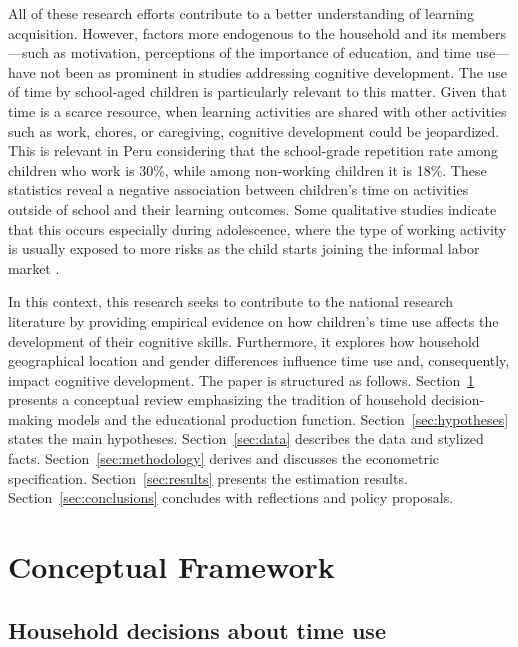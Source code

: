 \documentclass[12pt]{article}
\begin{document}
All of these research efforts contribute to a better understanding of learning
acquisition. However, factors more endogenous to the household and its
members—such as motivation, perceptions of the importance of education, and
time use—have not been as prominent in studies addressing cognitive
development. The use of time by school-aged children is particularly relevant
to this matter. Given that time is a scarce resource, when learning activities
are shared with other activities such as work, chores, or caregiving, cognitive
development could be jeopardized. This is relevant in Peru considering that
the school-grade repetition rate among children who work is 30\%, while among
non-working children it is 18\%. These statistics reveal a negative association
between children's time on activities outside of school and their learning
outcomes. Some qualitative studies indicate that this occurs especially during
adolescence, where the type of working activity is usually exposed to more
risks as the child starts joining the informal labor market
\citep{rojas2013}.

In this context, this research seeks to contribute to the national research
literature by providing empirical evidence on how children's time use affects
the development of their cognitive skills. Furthermore, it explores how
household geographical location and gender differences influence time use and,
consequently, impact cognitive development. The paper is structured as follows.
Section~\ref{sec:framework} presents a conceptual review emphasizing the
tradition of household decision-making models and the educational production
function. Section~\ref{sec:hypotheses} states the main hypotheses.
Section~\ref{sec:data} describes the data and stylized facts.
Section~\ref{sec:methodology} derives and discusses the econometric
specification. Section~\ref{sec:results} presents the estimation results.
Section~\ref{sec:conclusions} concludes with reflections and policy proposals.

\section{Conceptual Framework}
\label{sec:framework}

\subsection{Household decisions about time use}
\label{subsec:timeuse}
\end{document}
